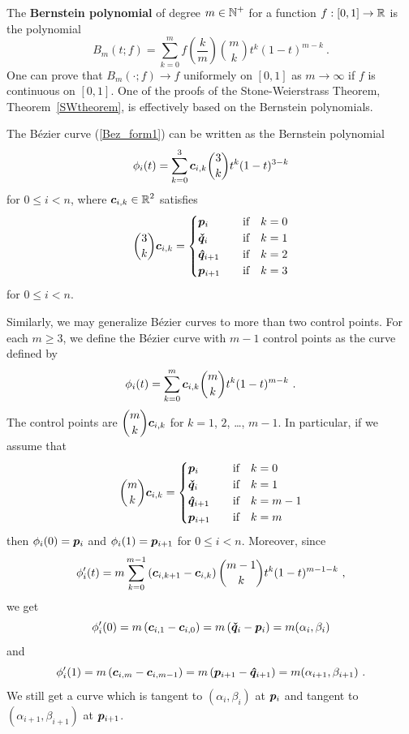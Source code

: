 \begin{rmk}
The {\bfseries Bernstein polynomial} of
degree $\displaystyle m \in \mathbb{N}^+$ for a function $f:[0,1]\rightarrow \mathbb{R}$ is the
polynomial
\begin{equation} \label{bernstein1}
B_m(t; f) = \sum_{k=0}^m f\left(\frac{k}{m}\right) \binom{m}{k}
t^k(1-t)^{m-k} \ .
\end{equation}
One can prove that $B_m(\cdot ; f) \rightarrow f$ uniformely on $[0,1]$ as
$m\rightarrow \infty$ if $f$ is continuous on $[0,1]$.  One of the
proofs of the Stone-Weierstrass Theorem, Theorem~\ref{SWtheorem}, is
effectively based on the Bernstein polynomials.

The Bézier curve (\ref{Bez_form1}) can be written as the Bernstein
polynomial
\[
\phi_i(t) = \sum_{k=0}^3 \bm{c}_{i,k} \binom{3}{k} t^k(1-t)^{3-k}
\]
for $0 \leq i < n$, where $\displaystyle \bm{c}_{i,k} \in \mathbb{R}^2$ satisfies
\[
\binom{3}{k} \bm{c}_{i,k} =
\begin{cases}
\bm{p}_i & \quad \text{if} \quad k = 0 \\
\bm{\check{q}}_i & \quad \text{if} \quad k = 1 \\
\bm{\hat{q}}_{i+1} & \quad \text{if} \quad k = 2 \\
\bm{p}_{i+1} & \quad \text{if} \quad k = 3
\end{cases}
\]
for $0 \leq i < n$.

Similarly, we may generalize Bézier curves to more
than two control points.  For each $m \geq 3$, we define the Bézier
curve with $m-1$ control points as the curve defined by
\begin{equation} \label{bernstein2}
\phi_i(t) = \sum_{k=0}^m \VEC{c}_{i,k} \binom{m}{k} t^k(1-t)^{m-k} \ .
\end{equation}
The control points are
$\displaystyle \binom{m}{k} \bm{c}_{i,k}$ for $k=1$, $2$,
\ldots, $m-1$.  In particular, if we assume that
\[
\binom{m}{k} \bm{c}_{i,k} =
\begin{cases}
\bm{p}_i & \quad \text{if} \quad k = 0 \\
\bm{\check{q}}_i & \quad \text{if} \quad k = 1 \\
\bm{\hat{q}}_{i+1} & \quad \text{if} \quad k = m-1 \\
\bm{p}_{i+1} & \quad \text{if} \quad k = m
\end{cases}
\]
then $\phi_i(0) = \bm{p}_i$ and
$\phi_i(1) = \bm{p}_{i+1}$ for $0\leq i < n$.  Moreover, since
\[
\phi_i'(t) = m
\sum_{k=0}^{m-1} \left( \bm{c}_{i,k+1} - \bm{c}_{i,k} \right)
\binom{m-1}{k} t^k(1-t)^{m-1-k} \ ,
\]
we get
\[
  \phi_i'(0) = m\left( \bm{c}_{i,1} - \bm{c}_{i,0} \right)
  = m\left(\bm{\check{q}}_i - \bm{p}_i\right) = m (\alpha_i , \beta_i )
\]
and
\[
\phi_i'(1) = m\left( \bm{c}_{i,m} - \bm{c}_{i,m-1} \right)
= m\left(\bm{p}_{i+1} - \bm{\hat{q}}_{i+1}\right)
= m (\alpha_{i+1} , \beta_{i+1} ) \ .
\]
We still get a curve which is tangent to $(\alpha_i,\beta_i)$ at
$\bm{p}_i$ and tangent to $(\alpha_{i+1},\beta_{i+1})$ at
$\bm{p}_{i+1}$.
\end{rmk}

